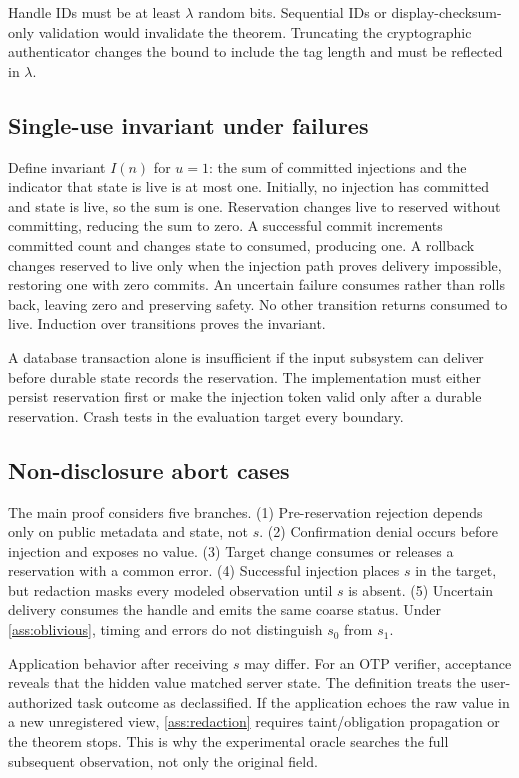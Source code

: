 Handle IDs must be at least $\lambda$ random bits. Sequential IDs or display-checksum-only validation would invalidate the theorem. Truncating the cryptographic authenticator changes the bound to include the tag length and must be reflected in $\lambda$.

\subsection{Single-use invariant under failures}

Define invariant $I(n)$ for $u=1$: the sum of committed injections and the indicator that state is live is at most one. Initially, no injection has committed and state is live, so the sum is one. Reservation changes live to reserved without committing, reducing the sum to zero. A successful commit increments committed count and changes state to consumed, producing one. A rollback changes reserved to live only when the injection path proves delivery impossible, restoring one with zero commits. An uncertain failure consumes rather than rolls back, leaving zero and preserving safety. No other transition returns consumed to live. Induction over transitions proves the invariant.

A database transaction alone is insufficient if the input subsystem can deliver before durable state records the reservation. The implementation must either persist reservation first or make the injection token valid only after a durable reservation. Crash tests in the evaluation target every boundary.

\subsection{Non-disclosure abort cases}

The main proof considers five branches. (1) Pre-reservation rejection depends only on public metadata and state, not $s$. (2) Confirmation denial occurs before injection and exposes no value. (3) Target change consumes or releases a reservation with a common error. (4) Successful injection places $s$ in the target, but redaction masks every modeled observation until $s$ is absent. (5) Uncertain delivery consumes the handle and emits the same coarse status. Under \cref{ass:oblivious}, timing and errors do not distinguish $s_0$ from $s_1$.

Application behavior after receiving $s$ may differ. For an OTP verifier, acceptance reveals that the hidden value matched server state. The definition treats the user-authorized task outcome as declassified. If the application echoes the raw value in a new unregistered view, \cref{ass:redaction} requires taint/obligation propagation or the theorem stops. This is why the experimental oracle searches the full subsequent observation, not only the original field.

